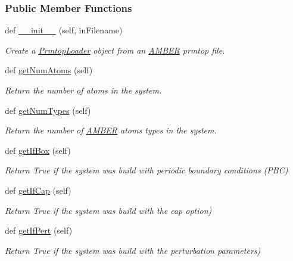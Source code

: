 \subsubsection*{Public Member Functions}
\begin{DoxyCompactItemize}
\item 
def \hyperlink{classsrc_1_1amberio_1_1PrmtopLoader_a5090d17f6ee0ee8f323b1b3c5ee68181}{\+\_\+\+\_\+init\+\_\+\+\_\+} (self, in\+Filename)
\begin{DoxyCompactList}\small\item\em Create a \hyperlink{classsrc_1_1amberio_1_1PrmtopLoader}{Prmtop\+Loader} object from an \hyperlink{classsrc_1_1amberio_1_1AMBER}{A\+M\+B\+ER} prmtop file. \end{DoxyCompactList}\item 
def \hyperlink{classsrc_1_1amberio_1_1PrmtopLoader_ab1f407476fadeeafa5875158140bdd37}{get\+Num\+Atoms} (self)
\begin{DoxyCompactList}\small\item\em Return the number of atoms in the system. \end{DoxyCompactList}\item 
def \hyperlink{classsrc_1_1amberio_1_1PrmtopLoader_ab5fd1aa3c74924b90c4582cc7e15a7ab}{get\+Num\+Types} (self)
\begin{DoxyCompactList}\small\item\em Return the number of \hyperlink{classsrc_1_1amberio_1_1AMBER}{A\+M\+B\+ER} atoms types in the system. \end{DoxyCompactList}\item 
def \hyperlink{classsrc_1_1amberio_1_1PrmtopLoader_a7a05c20f7bf19b7138bd626a5199aab0}{get\+If\+Box} (self)
\begin{DoxyCompactList}\small\item\em Return True if the system was build with periodic boundary conditions (P\+BC) \end{DoxyCompactList}\item 
def \hyperlink{classsrc_1_1amberio_1_1PrmtopLoader_aa6d06c4f57b4eb15a5d0b82c616aab96}{get\+If\+Cap} (self)
\begin{DoxyCompactList}\small\item\em Return True if the system was build with the cap option) \end{DoxyCompactList}\item 
def \hyperlink{classsrc_1_1amberio_1_1PrmtopLoader_a3273e9dae8c7ed212344f9a76f05e473}{get\+If\+Pert} (self)
\begin{DoxyCompactList}\small\item\em Return True if the system was build with the perturbation parameters) \end{DoxyCompactList}\item 

\end{DoxyCompactItemize}
